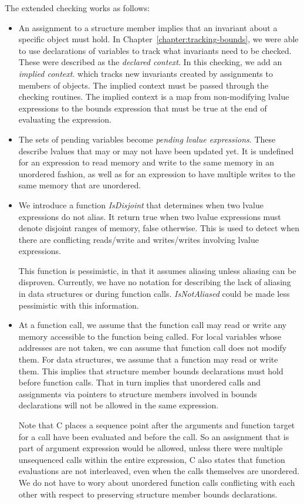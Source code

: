 The extended checking works as follows:
\begin{itemize}
\item An assignment to a structure member implies that an invariant about a specific
object must hold.  In Chapter~\ref{chapter:tracking-bounds}, we were able to use
declarations of variables to track what invariants need to be checked.    These were
described as  the {\em declared context}.  In this checking, we add an {\em implied context}.
which tracks new invariants created by assignments to members of objects.  The implied
context must be passed through the checking routines.   The implied context is a map
from non-modifying lvalue expressions to the bounds expression that must be true at the
end of evaluating the expression.
\item The sets of pending variables become {\em pending lvalue expressions}.   These
describe lvalues that may or may not have been updated yet.   It is undefined for an expression
to read memory and write to the same memory in an unordered fashion, as well as for an 
expression to have multiple writes to the same memory that are unordered.  
\item We introduce a function {\em IsDisjoint} that determines when two lvalue expressions
do not alias.  It return true when two lvalue expressions must denote disjoint ranges of memory,
false otherwise.   This is used to detect when there are conflicting reads/write and writes/writes
involving lvalue expressions.

This function is pessimistic, in that it assumes aliasing unless aliasing can be disproven.  Currently, 
we have no notation for describing the lack of aliasing in data structures or during function calls.   
{\em IsNotAliased} could be made less pessimistic with this information.

\item At a function call, we assume that the function call may read or write any memory accessible
to the function being called.  For local variables whose addresses are not taken, we can assume that 
function call does not modify them. For data structures, we assume that a function may read or write them.
This implies that structure member bounds declarations must hold before function calls.  That in
turn implies that unordered calls and assignments via pointers to structure members involved in bounds declarations will not be allowed in the same expression.

Note that C places a sequence point after the arguments and function target for a call have been 
evaluated and before the call.  So an assignment that is part of argument expression would be allowed,
unless there were multiple unsequenced calls within the entire expression,  C also states that
function evaluations are not interleaved, even when the calls themselves are unordered.  We do
not have to wory about unordered function calls conflicting with each other with respect to preserving
structure member bounds declarations.


\end{itemize}
